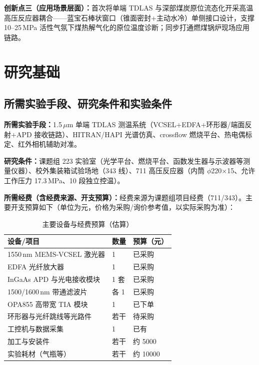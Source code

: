 \documentclass[12pt,a4paper]{article}
\begin{document}
\textbf{创新点三（应用场景层面）：}首次将单端 TDLAS 与深部煤炭原位流态化开采高温高压反应器耦合——蓝宝石棒状窗口（锥面密封+主动水冷）单侧接口设计，支撑 10--25\,MPa 活性气氛下煤热解气化的原位温度诊断；同步打通燃煤锅炉现场应用链路。

\section{研究基础}

\subsection{所需实验手段、研究条件和实验条件}

\textbf{所需实验手段：}1.5\,$\mu$m 单端 TDLAS 测温系统（VCSEL+EDFA+环形器/端面反射+APD 接收链路）、HITRAN/HAPI 光谱仿真、crossflow 燃烧平台、热电偶标定、红外相机辅助对准。

\textbf{研究条件：}课题组 223 实验室（光学平台、燃烧平台、函数发生器与示波器等测量仪器）、校外集装箱试验场地（343 线）、711 高压反应器（内筒 $\phi$220$\times$15、允许工作压力 17.3\,MPa、10 段独立控温）。

\textbf{所需经费（含经费来源、开支预算）：}经费来源为课题组项目经费（711/343）。主要开支预算如下（单位为元，价格为采购/询价参考值，以实际采购为准）：

\begin{table}[htbp]
  \centering
  \caption{主要设备与经费预算（估算）}
  \begin{tabular}{lll}
    \toprule
    设备/项目 & 数量 & 预算（元） \\
    \midrule
    1550\,nm MEMS-VCSEL 激光器 & 1 & 已采购 \\
    EDFA 光纤放大器 & 1 & 已采购 \\
    InGaAs APD 与光电接收模块 & 1 套 & 已采购 \\
    1500/1600\,nm 带通滤波片 & 各 1 & 已采购 \\
    OPA855 高带宽 TIA 模块 & 1 & 已下单 \\
    环形器与光纤跳线等光路件 & 若干 & 待采购 \\
    工控机与数据采集 & 1 & 已有 \\
    加工与安装件 & 若干 & 约 5000 \\
    实验耗材（气瓶等） & 若干 & 约 10000 \\
    \bottomrule
  \end{tabular}
\end{table}
\end{document}
